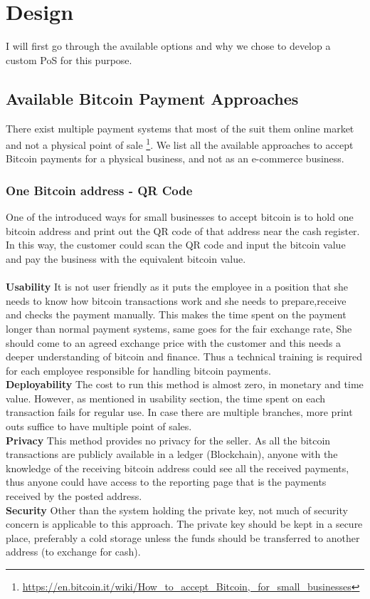 \section{Design}
I will first go through the available options and why we chose to develop a custom PoS for this purpose.
\subsection{Available Bitcoin Payment Approaches}
There exist multiple payment systems that most of the suit them online market and not a physical point of sale \footnote{\url{https://en.bitcoin.it/wiki/How_to_accept_Bitcoin,_for_small_businesses}}. We list all the available approaches to accept Bitcoin payments for a physical business, and not as an e-commerce business.

\subsubsection{One Bitcoin address - QR Code} 
One of the introduced ways for small businesses to accept bitcoin is to hold one bitcoin address and print out the QR code of that address near the cash register. In this way, the customer could scan the QR code and input the bitcoin value and pay the business with the equivalent bitcoin value. \\
\\\textbf{Usability} It is not user friendly as it puts the employee in a position that she needs to know how bitcoin transactions work and she needs to prepare,receive and checks the payment manually. This makes the time spent on the payment longer than normal payment systems, same goes for the fair exchange rate, She should come to an agreed exchange price with the customer and this needs a deeper understanding of bitcoin and finance. Thus a technical training is required for each employee responsible for handling bitcoin payments.
\\\textbf{Deployability} The cost to run this method is almost zero, in monetary and time value. However, as mentioned in usability section, the time spent on each transaction fails for regular use. In case there are multiple branches, more print outs suffice to have multiple point of sales.
\\\textbf{Privacy} This method provides no privacy for the seller. As all the bitcoin transactions are publicly available in a ledger (Blockchain), anyone with the knowledge of the receiving bitcoin address could see all the received payments, thus anyone could have access to the reporting page that is the payments received by the posted address.
\\\textbf{Security} Other than the system holding the private key, not much of security concern is applicable to this approach. The private key should be kept in a secure place, preferably a cold storage unless the funds should be transferred to another address (\eg to exchange for cash).
